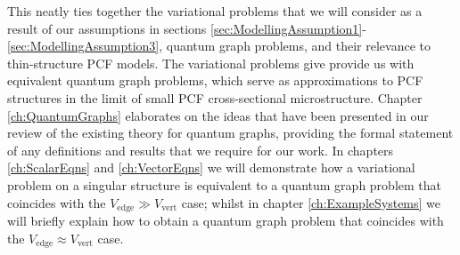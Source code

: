 This neatly ties together the variational problems that we will consider as a result of our assumptions in sections \ref{sec:ModellingAssumption1}-\ref{sec:ModellingAssumption3}, quantum graph problems, and their relevance to thin-structure PCF models.
The variational problems give provide us with equivalent quantum graph problems, which serve as approximations to PCF structures in the limit of small PCF cross-sectional microstructure.
Chapter \ref{ch:QuantumGraphs} elaborates on the ideas that have been presented in our review of the existing theory for quantum graphs, providing the formal statement of any definitions and results that we require for our work.
In chapters \ref{ch:ScalarEqns} and \ref{ch:VectorEqns} we will demonstrate how a variational problem on a singular structure is equivalent to a quantum graph problem that coincides with the $V_{\mathrm{edge}} \gg V_{\mathrm{vert}}$ case; whilst in chapter \ref{ch:ExampleSystems} we will briefly explain how to obtain a quantum graph problem that coincides with the $V_{\mathrm{edge}} \approx V_{\mathrm{vert}}$ case.


